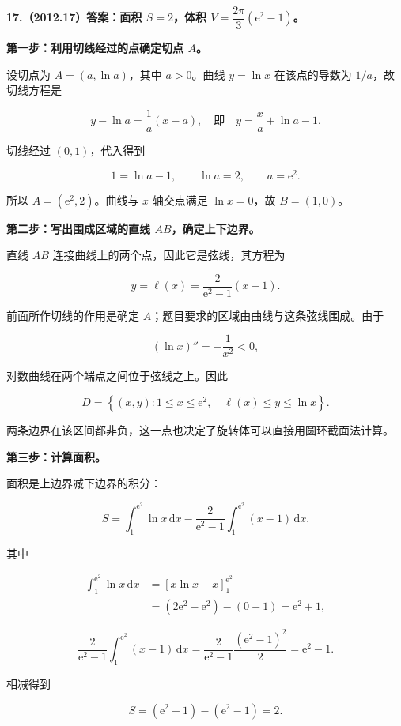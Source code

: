 \documentclass[UTF8,11pt,fontset=windows]{ctexart}
\begin{document}
\clearpage

\textbf{17.（2012.17）答案：面积 $S=2$，体积 $V=\dfrac{2\pi}{3}(\mathrm e^2-1)$。}

\textbf{第一步：利用切线经过的点确定切点 $A$。}

设切点为 $A=(a,\ln a)$，其中 $a>0$。曲线 $y=\ln x$ 在该点的导数为 $1/a$，故切线方程是

$$
y-\ln a=\frac1a(x-a),
\quad\text{即}\quad y=\frac xa+\ln a-1.
$$

切线经过 $(0,1)$，代入得到

$$
1=\ln a-1,
\qquad\ln a=2,
\qquad a=\mathrm e^2.
$$

所以 $A=(\mathrm e^2,2)$。曲线与 $x$ 轴交点满足 $\ln x=0$，故 $B=(1,0)$。

\textbf{第二步：写出围成区域的直线 $AB$，确定上下边界。}

直线 $AB$ 连接曲线上的两个点，因此它是弦线，其方程为

$$
y=\ell(x)=\frac{2}{\mathrm e^2-1}(x-1).
$$

前面所作切线的作用是确定 $A$；题目要求的区域由曲线与这条弦线围成。由于

$$
(\ln x)''=-\frac1{x^2}<0,
$$

对数曲线在两个端点之间位于弦线之上。因此

$$
D=\left\{(x,y):1\le x\le\mathrm e^2,
\quad\ell(x)\le y\le\ln x\right\}.
$$

两条边界在该区间都非负，这一点也决定了旋转体可以直接用圆环截面法计算。

\textbf{第三步：计算面积。}

面积是上边界减下边界的积分：

$$
S=\int_1^{\mathrm e^2}\ln x\,\mathrm dx
-\frac2{\mathrm e^2-1}\int_1^{\mathrm e^2}(x-1)\,\mathrm dx.
$$

其中

$$
\begin{aligned}
\int_1^{\mathrm e^2}\ln x\,\mathrm dx
&=[x\ln x-x]_1^{\mathrm e^2}\\
&=(2\mathrm e^2-\mathrm e^2)-(0-1)
=\mathrm e^2+1,
\end{aligned}
$$

$$
\frac2{\mathrm e^2-1}\int_1^{\mathrm e^2}(x-1)\,\mathrm dx
=\frac2{\mathrm e^2-1}\frac{(\mathrm e^2-1)^2}{2}
=\mathrm e^2-1.
$$

相减得到

$$
S=(\mathrm e^2+1)-(\mathrm e^2-1)=2.
$$
\end{document}
